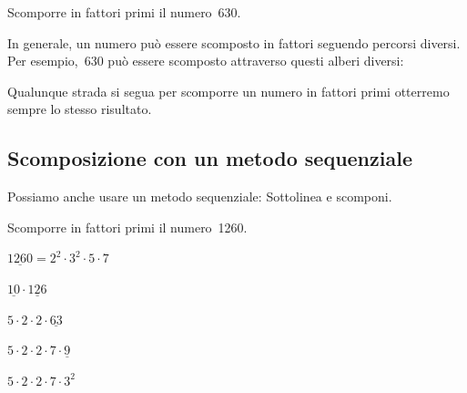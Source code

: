 \begin{inaccessibleblock}[]
 \begin{esempio}
 Scomporre in fattori primi il numero~630.
 \begin{center}
 
 \end{center}
 \end{esempio}
\end{inaccessibleblock}

In generale, un numero può essere scomposto in fattori seguendo percorsi 
diversi. Per esempio,~630 può essere scomposto attraverso questi alberi
diversi:

\begin{inaccessibleblock}[]
\begin{minipage}{0.40\textwidth}
 \centering
 
\end{minipage}%
\begin{minipage}{0.40\textwidth}
 \centering
 
\end{minipage}%
\end{inaccessibleblock}


Qualunque strada si segua per scomporre un numero in fattori primi 
otterremo sempre lo stesso risultato.

\subsection{Scomposizione con un metodo sequenziale}

Possiamo anche usare un metodo sequenziale:
Sottolinea e scomponi.

 \begin{esempio}
 Scomporre in fattori primi il numero~1260.

 \(\underline{1260} = 2^{2} \cdot 3^{2} \cdot 5 \cdot 7\)
 
 \(\underline{10} \cdot \underline{126}\)
 
 \(5 \cdot 2 \cdot 2 \cdot \underline{63}\)
 
 \(5 \cdot 2 \cdot 2 \cdot 7 \cdot \underline{9}\)
 
 \(5 \cdot 2 \cdot 2 \cdot 7 \cdot 3^{2}\)
 
 \end{esempio}

